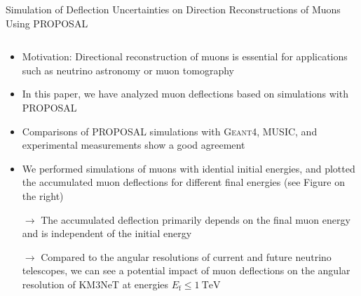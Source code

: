 \documentclass[t]{beamer}
\newlength{\itemseparation}
\begin{document}
\begin{columns}[onlytextwidth]
\begin{column}{\textwidth}
\begin{block}[equal height group=J]{Simulation of Deflection Uncertainties on Direction Reconstructions of Muons Using PROPOSAL}
\begin{columns}[onlytextwidth]
\begin{column}{0.33\textwidth}
            \begin{itemize}
              \setlength\itemsep{\itemseparation}
              \item Motivation: Directional reconstruction of muons is essential for applications such as neutrino astronomy or muon tomography
              \item In this paper, we have analyzed muon deflections based on simulations with PROPOSAL
              \item Comparisons of PROPOSAL simulations with \textsc{Geant4}, MUSIC, and experimental measurements show a good agreement
              \item We performed simulations of muons with idential initial energies, and plotted the accumulated muon deflections for different final energies (see Figure on the right)
            \end{itemize}
            \vspace{0.5em}

              \begin{center}
                \colorbox{tuYellow}{
                  \begin{minipage}[ht]{0.85\linewidth}
                    \begin{itemize}
                    \item[$\rightarrow$] The accumulated deflection primarily depends on the final muon energy and is independent of the initial energy
                    \item[$\rightarrow$] Compared to the angular resolutions of current and future neutrino telescopes, we can see a potential impact of muon deflections on the angular resolution of KM3NeT at energies $E_\text{f} \leq \SI{1}{\tera\electronvolt}$
                  \end{itemize}
                  \end{minipage}
                }
              \end{center}



\end{column}
\end{columns}
\end{block}
\end{column}
\end{columns}
\end{document}
